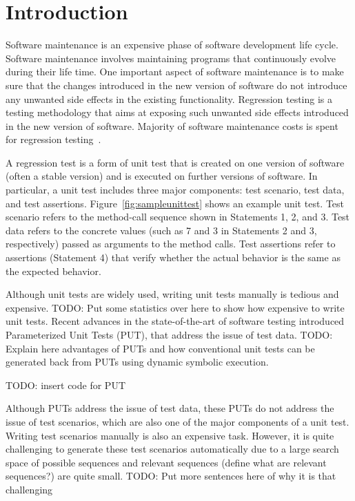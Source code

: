 \section{Introduction}
\label{sec:intro}

Software maintenance is an expensive phase of software development 
life cycle. Software maintenance involves maintaining programs that 
continuously evolve during their life time. One important aspect 
of software maintenance is to make sure that the changes introduced 
in the new version of software do not introduce any unwanted
side effects in the existing functionality. Regression testing is a testing 
methodology that aims at exposing such unwanted side effects introduced
in the new version of software. Majority of software
maintenance costs is spent for regression testing~\cite{}.

A regression test is a form of unit test that is created on one
version of software (often a stable version) and is executed 
on further versions of software. In particular, a unit test includes three 
major components: test scenario, test data, and test
assertions. Figure~\ref{fig:sampleunittest} shows an example unit test.
Test scenario refers to the method-call sequence shown in Statements
1, 2, and 3. Test data refers to the concrete values (such as 7 and 3
in Statements 2 and 3, respectively) passed as arguments to the method calls. 
Test assertions refer to assertions (Statement 4) that verify whether the actual
behavior is the same as the expected behavior.

Although unit tests are widely used, writing unit tests manually is tedious and expensive. TODO: Put
some statistics over here to show how expensive to write unit tests.
Recent advances in the state-of-the-art of software testing introduced Parameterized Unit Tests (PUT),
that address the issue of test data. TODO: Explain here advantages of PUTs and how conventional unit
tests can be generated back from PUTs using dynamic symbolic execution.

TODO: insert code for PUT

Although PUTs address the issue of test data, these PUTs do not address the issue of test scenarios,
which are also one of the major components of a unit test. Writing test scenarios manually is also
an expensive task. However, it is quite challenging to generate these test scenarios automatically
due to a large search space of possible sequences and relevant sequences (define what are relevant
sequences?) are quite small. TODO: Put more sentences here of why it is that challenging

